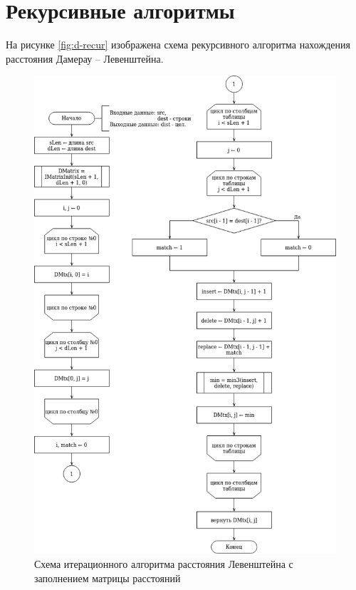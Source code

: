 \section{Рекурсивные алгоритмы}
На рисунке \ref{fig:d-recur} изображена схема рекурсивного алгоритма  нахождения расстояния Дамерау -- Левенштейна.
\newpage 
\begin{figure}[h!]
	\begin{center}
		\includegraphics[scale=0.6]{./assets/leven-matrix-iter.png}
	\end{center}
	
	\caption{Схема итерационного алгоритма расстояния Левенштейна с заполнением матрицы расстояний}
	\label{fig:l-iter-matrix}
\end{figure}


